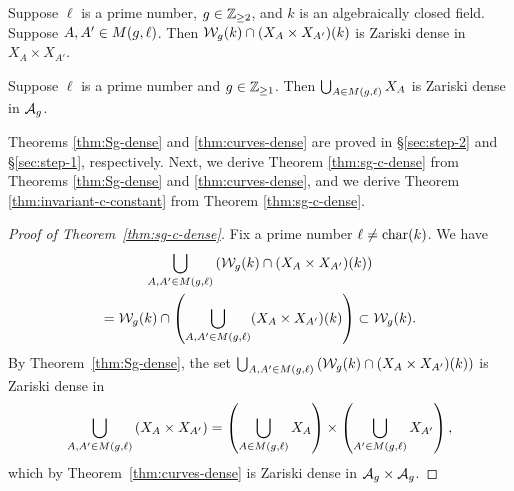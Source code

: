\documentclass{amsart}
\begin{document}
\begin{theorem}\label{thm:Sg-dense}
  Suppose $\ell$ is a prime number, $g\in\mathbb{Z}_{\ge 2}$, and $k$ is an algebraically closed field. Suppose $A,A' \in M(g,\ell)$. Then $\mathcal{W}_g(k) \cap (X_A \times X_{A'})(k)$ is Zariski dense in $X_A \times X_{A'}$.
\end{theorem}

\begin{theorem}\label{thm:curves-dense}
    Suppose $\ell$ is a prime number and $g\in\mathbb{Z}_{\ge 1}$. Then $\bigcup_{A \in M(g,\ell)} X_A$ is Zariski dense in $\mathcal{A}_g$.
\end{theorem}

Theorems \ref{thm:Sg-dense} and \ref{thm:curves-dense} are proved in \S\ref{sec:step-2} and \S\ref{sec:step-1}, respectively. Next, we derive Theorem \ref{thm:sg-c-dense} from Theorems \ref{thm:Sg-dense} and \ref{thm:curves-dense}, and we derive Theorem \ref{thm:invariant-c-constant} from Theorem \ref{thm:sg-c-dense}.

\begin{proof}[Proof of Theorem~\ref{thm:sg-c-dense}]
Fix a prime number $\ell\neq\operatorname{char}(k)$. We have
\begin{multline*}
\bigcup_{A,A' \in M(g,\ell)} \left(\mathcal{W}_g(k) \cap (X_A \times X_{A'})(k)\right) \\
 =  \mathcal{W}_g(k) \cap \left(\bigcup_{A,A' \in M(g,\ell)} (X_A \times X_{A'})(k)\right)
   \subset \mathcal{W}_g(k).
\end{multline*}
By Theorem~\ref{thm:Sg-dense}, the set
$\bigcup_{A,A' \in M(g,\ell)} \left(\mathcal{W}_g(k) \cap (X_A \times X_{A'})(k)\right)$ is Zariski dense in
$$
\bigcup_{A,A' \in M(g,\ell)} \left(X_A \times X_{A'}\right) =
    \left(\bigcup_{A \in M(g,\ell)} X_A\right) \times \left(\bigcup_{A' \in M(g,\ell)} X_{A'}\right),
    $$
    which by Theorem~\ref{thm:curves-dense} is Zariski dense in $\mathcal{A}_g \times \mathcal{A}_g$.
\end{proof}
\end{document}
